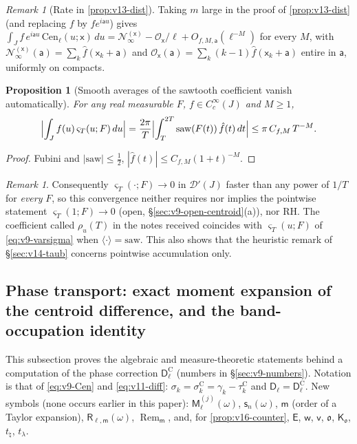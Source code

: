 \documentclass[11pt,a4paper]{article}
\numberwithin{equation}{section}
\newtheorem{proposition}[theorem]{Proposition}
\theoremstyle{definition}
\theoremstyle{remark}
\newtheorem{remark}[theorem]{Remark}
\begin{document}
\begin{remark}[Rate in \cref{prop:v13-dist}]
Taking $m$ large in the proof of \cref{prop:v13-dist} (and replacing $f$ by $fe^{i\mathsf au}$) gives $\int_Jf\,e^{i\mathsf au}\,\mathrm{Cen}_\ell(u;\mathsf x)\,du=\mathscr N_\infty^{(\mathsf x)}-\mathscr O_{\mathsf x}/\ell+O_{f,M,\mathsf a}(\ell^{-M})$ for every $M$, with $\mathscr N_\infty^{(\mathsf x)}(\mathsf a)=\sum_k\hat f(\mathsf x_k+\mathsf a)$ and $\mathscr O_{\mathsf x}(\mathsf a)=\sum_k(k-1)\hat f(\mathsf x_k+\mathsf a)$ entire in $\mathsf a$, uniformly on compacts.
\end{remark}

\begin{proposition}[Smooth averages of the sawtooth coefficient vanish automatically]\label{prop:v15-auto}
For any real measurable $F$, $f\in C_c^\infty(J)$ and $M\ge1$,
\begin{equation}
\Bigl|\int_Jf(u)\,\varsigma_T(u;F)\,du\Bigr|=\frac{2\pi}T\Bigl|\int_T^{2T}\mathrm{saw}(F(t))\,\hat f(t)\,dt\Bigr|\le\pi\,C_{f,M}\,T^{-M} .
\end{equation}
\end{proposition}
\begin{proof}
Fubini and $|\mathrm{saw}|\le\frac12$, $|\hat f(t)|\le C_{f,M}(1+t)^{-M}$.
\end{proof}
\begin{remark}
Consequently $\varsigma_T(\cdot;F)\to0$ in $\mathcal D'(J)$ faster than any power of $1/T$ for \emph{every} $F$, so this convergence neither requires nor implies the pointwise statement $\varsigma_T(1;F)\to0$ (open, \S\ref{sec:v9-open-centroid}(a)), nor RH. The coefficient called $\rho_u(T)$ in the notes received coincides with $\varsigma_T(u;F)$ of \eqref{eq:v9-varsigma} when $\langle\cdot\rangle=\mathrm{saw}$. This also shows that the heuristic remark of \S\ref{sec:v14-taub} concerns pointwise accumulation only.
\end{remark}

\subsection{Phase transport: exact moment expansion of the centroid difference, and the band-occupation identity}\label{sec:v16-transport}
This subsection proves the algebraic and measure-theoretic statements behind a computation of the phase correction $\mathsf D_\ell^{\mathrm C}$ (numbers in \S\ref{sec:v9-numbers}). Notation is that of \eqref{eq:v9-Cen} and \eqref{eq:v11-diff}: $\sigma_k=\sigma_k^{\mathrm C}=\gamma_k-\tau_k^{\mathrm C}$ and $\mathsf D_\ell=\mathsf D_\ell^{\mathrm C}$. New symbols (none occurs earlier in this paper): $\mathsf M_\ell^{(j)}(\omega)$, $\mathsf s_n(\omega)$, $\mathsf m$ (order of a Taylor expansion), $\mathsf R_{\ell,\mathsf m}(\omega)$, $\operatorname{Rem}_{\mathsf m}$, and, for \cref{prop:v16-counter}, $\mathsf E$, $\mathsf w$, $\mathsf v$, $\mathfrak o$, $\mathsf K_{\mathfrak o}$, $t_\natural$, $t_\lambda$.
\end{document}
